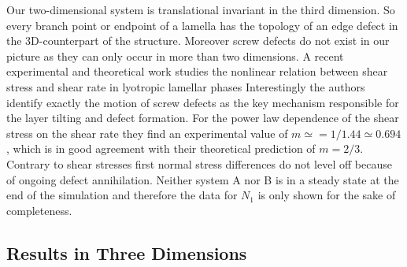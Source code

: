 \documentclass[8.5pt,twoside,twocolumn]{article}
\begin{document}
Our two-dimensional system is translational invariant in the third dimension.
So every branch point or endpoint of a lamella has the topology of an edge defect in the 3D-counterpart of the structure.
Moreover screw defects do not exist in our picture as they can only occur in more than two dimensions.
A recent experimental and theoretical work studies the nonlinear relation between shear stress and shear rate in lyotropic lamellar phases \cite{Lu08}
Interestingly the authors identify exactly the motion of screw defects as the key mechanism responsible for the layer tilting and defect formation. 
For the power law dependence of the shear stress on the shear rate they find an experimental value of $m\simeq=1/1.44\simeq 0.694$, which is in good agreement with their theoretical prediction of $m=2/3$.\\
Contrary to shear stresses first normal stress differences do not level off because of ongoing defect annihilation.
Neither system A nor B is in a steady state at the end of the simulation and therefore the data for $N_1$ is only shown for the sake of completeness.



\subsection*{Results in Three Dimensions}
\end{document}
